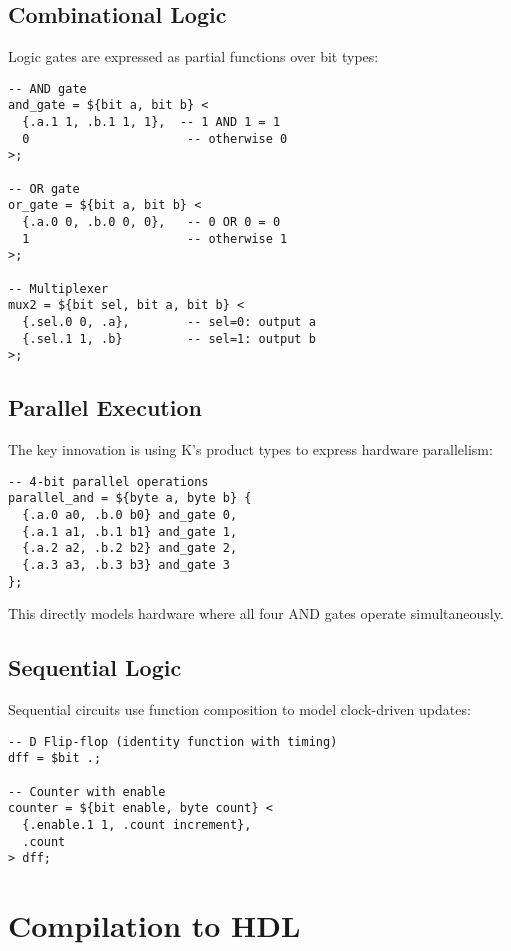 \documentclass[10pt,twocolumn]{article}
\begin{document}
\subsection{Combinational Logic}

Logic gates are expressed as partial functions over bit types:

\begin{lstlisting}
-- AND gate
and_gate = ${bit a, bit b} <
  {.a.1 1, .b.1 1, 1},  -- 1 AND 1 = 1
  0                      -- otherwise 0
>;

-- OR gate  
or_gate = ${bit a, bit b} <
  {.a.0 0, .b.0 0, 0},   -- 0 OR 0 = 0
  1                      -- otherwise 1
>;

-- Multiplexer
mux2 = ${bit sel, bit a, bit b} <
  {.sel.0 0, .a},        -- sel=0: output a
  {.sel.1 1, .b}         -- sel=1: output b
>;
\end{lstlisting}

\subsection{Parallel Execution}

The key innovation is using K's product types to express hardware parallelism:

\begin{lstlisting}
-- 4-bit parallel operations
parallel_and = ${byte a, byte b} {
  {.a.0 a0, .b.0 b0} and_gate 0,
  {.a.1 a1, .b.1 b1} and_gate 1,
  {.a.2 a2, .b.2 b2} and_gate 2,
  {.a.3 a3, .b.3 b3} and_gate 3
};
\end{lstlisting}

This directly models hardware where all four AND gates operate simultaneously.

\subsection{Sequential Logic}

Sequential circuits use function composition to model clock-driven updates:

\begin{lstlisting}
-- D Flip-flop (identity function with timing)
dff = $bit .;

-- Counter with enable
counter = ${bit enable, byte count} <
  {.enable.1 1, .count increment},
  .count
> dff;
\end{lstlisting}

\section{Compilation to HDL}
\end{document}
